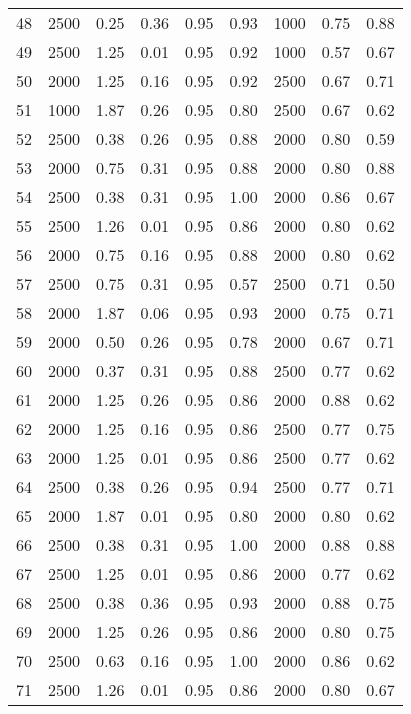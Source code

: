 \begin{longtable}[c]{ccccccccc}
48  &  2500 &  0.25 &  0.36 &  0.95 &  0.93 &  1000 &  0.75 &  0.88 \\
49  &  2500 &  1.25 &  0.01 &  0.95 &  0.92 &  1000 &  0.57 &  0.67 \\
50  &  2000 &  1.25 &  0.16 &  0.95 &  0.92 &  2500 &  0.67 &  0.71 \\
51  &  1000 &  1.87 &  0.26 &  0.95 &  0.80 &  2500 &  0.67 &  0.62 \\
52  &  2500 &  0.38 &  0.26 &  0.95 &  0.88 &  2000 &  0.80 &  0.59 \\
53  &  2000 &  0.75 &  0.31 &  0.95 &  0.88 &  2000 &  0.80 &  0.88 \\
54  &  2500 &  0.38 &  0.31 &  0.95 &  1.00 &  2000 &  0.86 &  0.67 \\
55  &  2500 &  1.26 &  0.01 &  0.95 &  0.86 &  2000 &  0.80 &  0.62 \\
56  &  2000 &  0.75 &  0.16 &  0.95 &  0.88 &  2000 &  0.80 &  0.62 \\
57  &  2500 &  0.75 &  0.31 &  0.95 &  0.57 &  2500 &  0.71 &  0.50 \\
58  &  2000 &  1.87 &  0.06 &  0.95 &  0.93 &  2000 &  0.75 &  0.71 \\
59  &  2000 &  0.50 &  0.26 &  0.95 &  0.78 &  2000 &  0.67 &  0.71 \\
60  &  2000 &  0.37 &  0.31 &  0.95 &  0.88 &  2500 &  0.77 &  0.62 \\
61  &  2000 &  1.25 &  0.26 &  0.95 &  0.86 &  2000 &  0.88 &  0.62 \\
62  &  2000 &  1.25 &  0.16 &  0.95 &  0.86 &  2500 &  0.77 &  0.75 \\
63  &  2000 &  1.25 &  0.01 &  0.95 &  0.86 &  2500 &  0.77 &  0.62 \\
64  &  2500 &  0.38 &  0.26 &  0.95 &  0.94 &  2500 &  0.77 &  0.71 \\
65  &  2000 &  1.87 &  0.01 &  0.95 &  0.80 &  2000 &  0.80 &  0.62 \\
66  &  2500 &  0.38 &  0.31 &  0.95 &  1.00 &  2000 &  0.88 &  0.88 \\
67  &  2500 &  1.25 &  0.01 &  0.95 &  0.86 &  2000 &  0.77 &  0.62 \\
68  &  2500 &  0.38 &  0.36 &  0.95 &  0.93 &  2000 &  0.88 &  0.75 \\
69  &  2000 &  1.25 &  0.26 &  0.95 &  0.86 &  2000 &  0.80 &  0.75 \\
70  &  2500 &  0.63 &  0.16 &  0.95 &  1.00 &  2000 &  0.86 &  0.62 \\
71  &  2500 &  1.26 &  0.01 &  0.95 &  0.86 &  2000 &  0.80 &  0.67 \\

\end{longtable}
